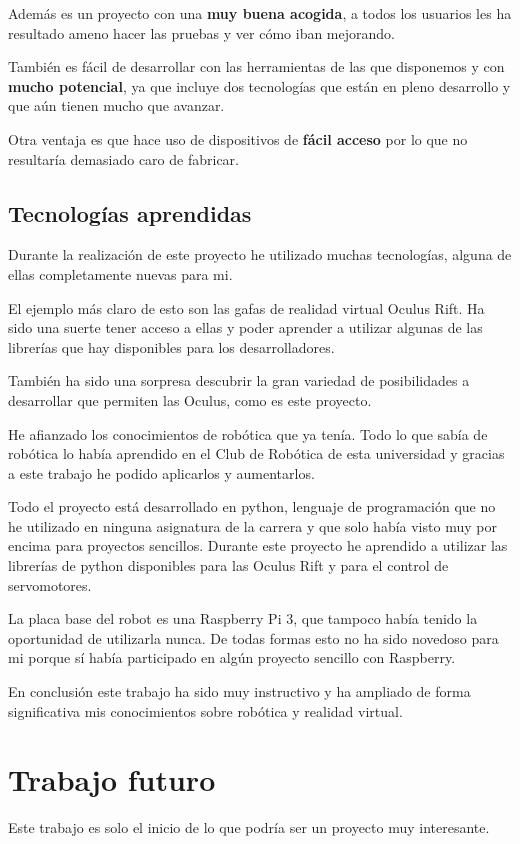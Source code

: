 \documentclass[twoside, 11pt]{epstfg}
\begin{document}
Además es un proyecto con una \textbf{muy buena acogida}, a todos los usuarios les ha resultado ameno hacer las pruebas y ver cómo iban mejorando.

También es fácil de desarrollar con las herramientas de las que disponemos y con \textbf{mucho potencial}, ya que incluye dos tecnologías que están en pleno desarrollo y que aún tienen mucho que avanzar.

Otra ventaja es que hace uso de dispositivos de \textbf{fácil acceso} por lo que no resultaría demasiado caro de fabricar.

\subsection{Tecnologías aprendidas}

Durante la realización de este proyecto he utilizado muchas tecnologías, alguna de ellas completamente nuevas para mi.

El ejemplo más claro de esto son las gafas de realidad virtual Oculus Rift. Ha sido una suerte tener acceso a ellas y poder aprender a utilizar algunas de las librerías que hay disponibles para los desarrolladores.

También ha sido una sorpresa descubrir la gran variedad de posibilidades a desarrollar que permiten las Oculus, como es este proyecto.

He afianzado los conocimientos de robótica que ya tenía. Todo lo que sabía de robótica lo había aprendido en el Club de Robótica de esta universidad y gracias a este trabajo he podido aplicarlos y aumentarlos.

Todo el proyecto está desarrollado en python, lenguaje de programación que no he utilizado en ninguna asignatura de la carrera y que solo había visto muy por encima para proyectos sencillos.
Durante este proyecto he aprendido a utilizar las librerías de python disponibles para las Oculus Rift y para el control de servomotores.

La placa base del robot es una Raspberry Pi 3, que tampoco había tenido la oportunidad de utilizarla nunca. De todas formas esto no ha sido novedoso para mi porque sí había participado en algún proyecto sencillo con Raspberry.

En conclusión este trabajo ha sido muy instructivo y ha ampliado de forma significativa mis conocimientos sobre robótica y realidad virtual.



\section{Trabajo futuro}
Este trabajo es solo el inicio de lo que podría ser un proyecto muy interesante.
\end{document}
